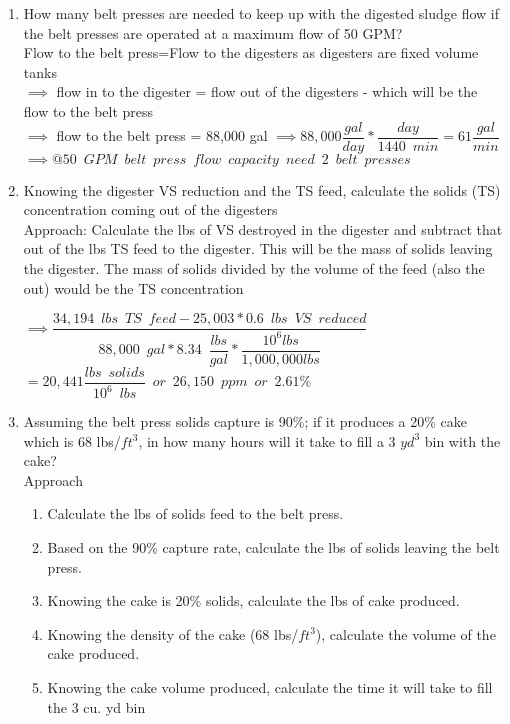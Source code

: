 \begin{enumerate}
\begin{enumerate}
\item How many belt presses are needed to keep up with the digested sludge flow if the belt presses are operated at a maximum flow of 50 GPM?\\
Flow to the belt press=Flow to the digesters as digesters are fixed volume tanks\\
$\implies$ flow in to the digester = flow out of the digesters - which will be the flow to the belt press\\
$\implies$ flow to the belt press = 88,000 gal
$\implies 88,000 \dfrac{gal}{day}*\dfrac{day}{1440 \enspace min}= 61 \dfrac{gal}{min}$\\
$\implies @ 50 \enspace GPM \enspace belt \enspace press \enspace flow \enspace capacity \enspace need \enspace \boxed{2 \enspace belt \enspace presses}$
\pagebreak
\item Knowing the digester VS reduction and the TS feed, calculate the solids (TS) concentration coming out of the digesters\\
Approach:  Calculate the lbs of VS destroyed in the digester and subtract that out of the lbs TS feed to the digester.  This will be the mass of solids leaving the digester.  The mass of solids divided by the volume of the feed (also the out) would be the TS concentration\\

\vspace{0.25cm}

$\implies \dfrac{34,194 \enspace lbs \enspace TS \enspace feed - 25,003*0.6 \enspace lbs \enspace VS \enspace reduced}{88,000 \enspace gal*8.34 \enspace \dfrac{lbs}{gal}*\dfrac{10^6lbs}{1,000,000lbs}}$\\
\vspace{0.25cm}
$=20,441\dfrac{lbs \enspace solids}{10^6 \enspace lbs} \enspace or \enspace 26,150 \enspace ppm \enspace or \enspace \boxed{2.61\%} $


\item Assuming the belt press solids capture is 90\%; if it produces a 20\% cake which is 68 lbs/$ft^3$, in how many hours will it take to fill a 3 $yd^3$ bin with the cake?\\
Approach\\
\begin{enumerate}
\item Calculate the lbs of solids feed to the belt press. \item Based on the 90\% capture rate, calculate the lbs of solids leaving the belt press.  \item Knowing the cake is 20\% solids, calculate the lbs of cake produced. \item Knowing the density of the cake (68 lbs/$ft^3$), calculate the volume of the cake produced. \item Knowing the cake volume produced, calculate the time it will take to fill the 3 cu. yd bin\end{enumerate}


\end{enumerate}
\end{enumerate}
